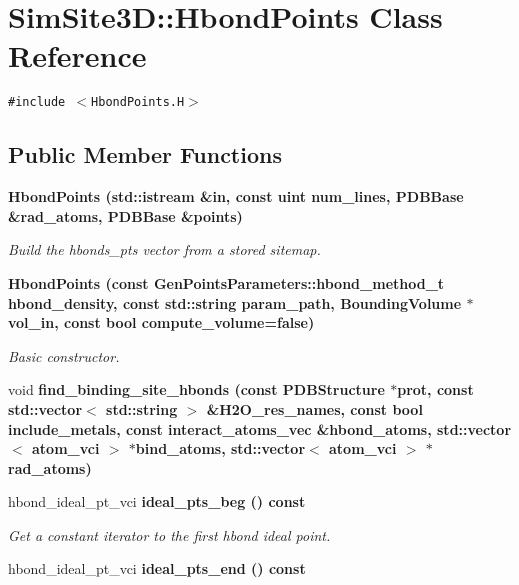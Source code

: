 \section{SimSite3D::Hbond\-Points Class Reference}
\label{classSimSite3D_1_1HbondPoints}
{\tt \#include $<$Hbond\-Points.H$>$}

\subsection*{Public Member Functions}
\begin{CompactItemize}
\item 
\bf{Hbond\-Points} (std::istream \&in, const uint num\_\-lines, \bf{PDBBase} \&rad\_\-atoms, \bf{PDBBase} \&points)
\begin{CompactList}\small\item\em Build the hbonds\_\-pts vector from a stored sitemap. \item\end{CompactList}\item 
\bf{Hbond\-Points} (const \bf{Gen\-Points\-Parameters::hbond\_\-method\_\-t} hbond\_\-density, const std::string param\_\-path, \bf{Bounding\-Volume} $\ast$vol\_\-in, const bool compute\_\-volume=false)
\begin{CompactList}\small\item\em Basic constructor. \item\end{CompactList}\item 
void \bf{find\_\-binding\_\-site\_\-hbonds} (const \bf{PDBStructure} $\ast$prot, const std::vector$<$ std::string $>$ \&H2O\_\-res\_\-names, const bool include\_\-metals, const interact\_\-atoms\_\-vec \&hbond\_\-atoms, std::vector$<$ atom\_\-vci $>$ $\ast$bind\_\-atoms, std::vector$<$ atom\_\-vci $>$ $\ast$rad\_\-atoms)
\item 
hbond\_\-ideal\_\-pt\_\-vci \bf{ideal\_\-pts\_\-beg} () const \label{classSimSite3D_1_1HbondPoints_cfc90ecdc78a82f1fc2cd6a3894f71f5}

\begin{CompactList}\small\item\em Get a constant iterator to the first hbond ideal point. \item\end{CompactList}\item 
hbond\_\-ideal\_\-pt\_\-vci \bf{ideal\_\-pts\_\-end} () const \label{classSimSite3D_1_1HbondPoints_dbcd5aa42ce40703760fab5195f15093}


\end{CompactItemize}
